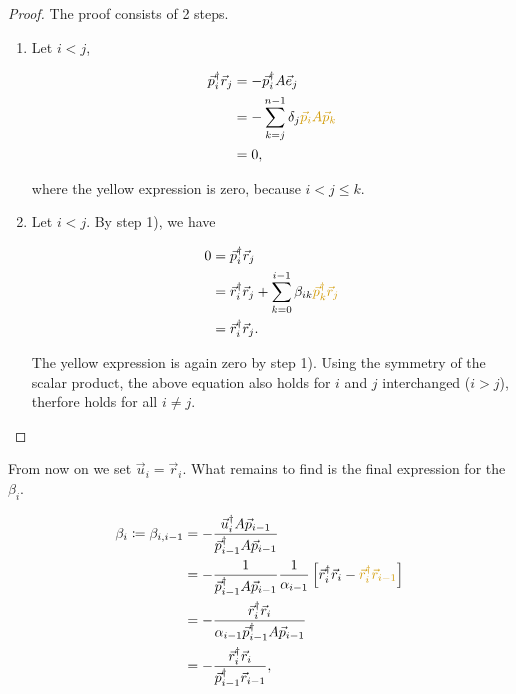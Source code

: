 \documentclass{article}
\theoremstyle{plain} %
\theoremstyle{convention} %
\theoremstyle{remark} %
\numberwithin{equation}{section}
\begin{document}
\begin{proof}

The proof consists of 2 steps.

\begin{enumerate}[label={\arabic*)}]
    \item Let $i<j$,

    \begin{align*}
        \vec{p}_i^{\dagger} \vec{r}_j &= - \vec{p}_i^{\dagger} A \vec{e}_j \\
                                      &= - \sum_{k=j}^{n-1} \delta_j \textcolor{cyellow}{\vec{p}_i A \vec{p}_k} \\
                                      &= 0,
    \end{align*}

    where the \textcolor{cyellow}{yellow} expression is \textcolor{cyellow}{zero}, because $i<j\leq k$.

    \item Let $i<j$. By step 1), we have

    \begin{align*}
        0 &= \vec{p}_i^{\dagger} \vec{r}_j \\
          &= \vec{r}_i^{\dagger} \vec{r}_j + \sum_{k=0}^{i-1} \beta_{ik} \textcolor{cyellow}{\vec{p}_k^{\dagger} \vec{r}_j} \\
          &= \vec{r}_i^{\dagger} \vec{r}_j.
    \end{align*}

    The \textcolor{cyellow}{yellow} expression is again \textcolor{cyellow}{zero} by step 1). Using the symmetry of the scalar product, the above equation also holds for $i$ and $j$ interchanged ($i>j$), therfore holds for all $i \neq j$.

\end{enumerate}

\end{proof}

From now on we set $\vec{u}_i = \vec{r}_i$. What remains to find is the final expression for the $\beta_i$.

\begin{align*}
    \beta_i \coloneqq \beta_{i,i-1} &= - \frac{ \vec{u}_i^{\dagger} A \vec{p}_{i-1} }{ \vec{p}_{i-1}^{\dagger} A \vec{p}_{i-1} } \\
    &= - \frac{1}{\vec{p}_{i-1}^{\dagger} A \vec{p}_{i-1} } \frac{1}{\alpha_{i-1}} \left[ \vec{r}_i^{\dagger} \vec{r}_i - \textcolor{cyellow}{\vec{r}_i^{\dagger} \vec{r}_{i-1}} \right] \\
    &= - \frac{ \vec{r}_i^{\dagger} \vec{r}_i }{ \alpha_{i-1} \vec{p}_{i-1}^{\dagger} A \vec{p}_{i-1} } \\
    &= - \frac{ \vec{r}_i^{\dagger} \vec{r}_i }{ \vec{p}_{i-1}^{\dagger} \vec{r}_{i-1} },
\end{align*}
\end{document}
